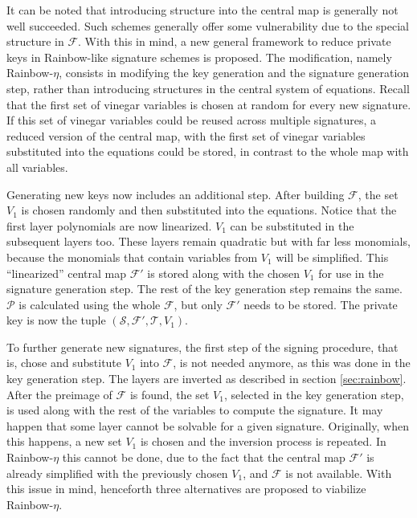 \documentclass{ufsctex/ufsctex}
\begin{document}
It can be noted that introducing structure into the central map is generally
not well succeeded. Such schemes generally offer some vulnerability due to the
special structure in $\mathcal{F}$. With this in mind, a new general framework
to reduce private keys in Rainbow-like signature schemes is proposed. The
modification, namely Rainbow-$\eta$, consists in modifying the key generation
and the signature generation step, rather than introducing structures in the
central system of equations. Recall that the first set of vinegar variables is
chosen at random for every new signature. If this set of vinegar variables
could be reused across multiple signatures, a reduced version of the central
map, with the first set of vinegar variables substituted into the equations
could be stored, in contrast to the whole map with all variables.

Generating new keys now includes an additional step. After building
$\mathcal{F}$, the set $V_1$ is chosen randomly and then substituted into the
equations. Notice that the first layer polynomials are now linearized. $V_1$
can be substituted in the subsequent layers too. These layers remain quadratic
but with far less monomials, because the monomials that contain variables from
$V_1$ will be simplified. This ``linearized'' central map $\mathcal{F'}$ is
stored along with the chosen $V_1$ for use in the signature generation step.
The rest of the key generation step remains the same. $\mathcal{P}$ is
calculated using the whole $\mathcal{F}$, but only $\mathcal{F'}$ needs to be
stored. The private key is now the tuple $(\mathcal{S}, \mathcal{F'},
\mathcal{T}, V_1)$.

To further generate new signatures, the first step of the signing procedure,
that is, chose and substitute $V_1$ into $\mathcal{F}$, is not needed anymore,
as this was done in the key generation step. The layers are inverted as
described in section \ref{sec:rainbow}. After the preimage of $\mathcal{F}$ is
found, the set $V_1$, selected in the key generation step, is used along with
the rest of the variables to compute the signature. It may happen that some
layer cannot be solvable for a given signature. Originally, when this happens,
a new set $V_1$ is chosen and the inversion process is repeated. In
Rainbow-$\eta$ this cannot be done, due to the fact that the central map
$\mathcal{F'}$ is already simplified with the previously chosen $V_1$, and
$\mathcal{F}$ is not available. With this issue in mind, henceforth three
alternatives are proposed to viabilize Rainbow-$\eta$.
\end{document}
